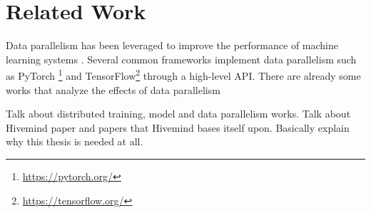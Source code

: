 \chapter{Related Work}\label{chapter:related-work}
Data parallelism has been leveraged to improve the performance of machine learning systems \cite{alexnet2012}.
Several common frameworks implement data parallelism such as PyTorch \footnote{\href{https://pytorch.org/}{https://pytorch.org/}} and TensorFlow\footnote{\href{https://tensorflow.org/}{https://tensorflow.org/}} through a high-level API.
There are already some works that analyze the effects of data parallelism \cite{DBLP:journals/corr/abs-2003-11316}

Talk about distributed training, model and data parallelism works.
Talk about Hivemind paper and papers that Hivemind bases itself upon.
Basically explain why this thesis is needed at all.

